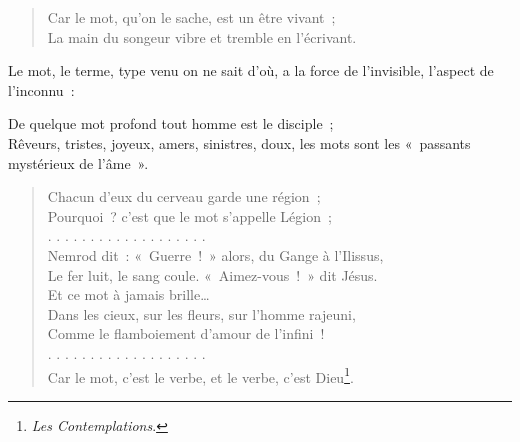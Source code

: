 \documentclass[french,twoside]{book} %
\begin{document}
\begin{verse}
Car le mot, qu’on le sache, est un être vivant ;\\
La main du songeur vibre et tremble en l’écrivant.\\
\end{verse}

\noindent Le mot, le terme, type venu on ne sait d’où, a la force de l’invisible, l’aspect de l’inconnu :\par

De quelque mot profond tout homme est le disciple ;\\

\noindent Rêveurs, tristes, joyeux, amers, sinistres, doux, les mots sont les « passants mystérieux de l’âme ».\par


\begin{verse}
Chacun d’eux du cerveau garde une région ;\\
Pourquoi ? c’est que le mot s’appelle Légion ;\\
. . . . . . . . . . . . . . . . . . .\\
Nemrod dit : « Guerre ! » alors, du Gange à l’Ilissus,\\
Le fer luit, le sang coule. « Aimez-vous ! » dit Jésus.\\
Et ce mot à jamais brille…\\
Dans les cieux, sur les fleurs, sur l’homme rajeuni,\\
Comme le flamboiement d’amour de l’infini !\\
. . . . . . . . . . . . . . . . . . .\\
Car le mot, c’est le verbe, et le verbe, c’est Dieu\footnote{\emph{Les Contemplations}.}.\\
\end{verse}
\end{document}
